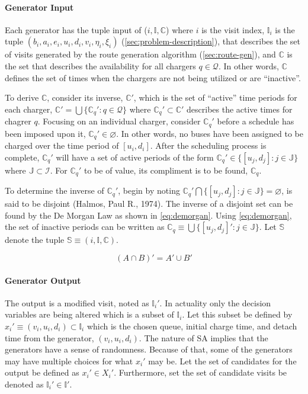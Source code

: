 \documentclass[11pt,a4paper,final]{article}
\newcommand{\visit}{(b_i, a_i, e_i, u_i, d_i, v_i, \eta_i, \xi_i)}
\newcommand{\I}{\mathbb{I}}                 %
\newcommand{\C}{\mathbb{C}}                 %
\newcommand{\Sol}{\mathbb{S}}               %
\newcommand{\Qset}{\mathcal{Q}}             %
\newcommand{\Jsetq}{\mathbb{J}}             %
\begin{document}
\paragraph{Generator Input}
\label{sec:org8f218dd}
Each generator has the tuple input of (\(i, \I, \C\)) where \(i\) is the visit index, \(\I_i\) is the tuple \(\visit\)
(\ref{sec:problem-description}), that describes the set of visits generated by the route generation algorithm
(\ref{sec:route-gen}), and \(\C\) is the set that describes the availability for all chargers \(q \in \Qset\). In other words, \(\C\)
defines the set of times when the chargers are not being utilized or are ``inactive''.

To derive \(\C\), consider its inverse, \(\C'\), which is the set of ``active'' time periods for each charger, \(\C' = \bigcup
\{\C_q' : q \in \mathcal{Q}\}\) where \(\C_q' \subset \C'\) describes the active times for chagrer \(q\). Focusing on an individual charger,
consider \(\C_q'\) before a schedule has been imposed upon it, \(\C_q' \in \varnothing\). In other words, no buses have been
assigned to be charged over the time period of \([u_i, d_i]\). After the scheduling process is complete, \(\C_q'\) will have
a set of active periods of the form \(\C_q' \in \{[u_j, d_j]: j \in \Jsetq \}\) where \(\Jsetq \subset \mathcal{I}\). For \(\C_q'\) to be of
value, its compliment is to be found, \(\C_q\).

To determine the inverse of \(\C_q'\), begin by noting \(\C_q' \bigcap \{[u_j, d_j] : j \in \Jsetq\} = \varnothing\), is said to be
disjoint (Halmos, Paul R., 1974). The inverse of a disjoint set can be found by the De Morgan Law as shown in
\ref{eq:demorgan}. Using \ref{eq:demorgan}, the set of inactive periods can be written as \(\C_q \equiv \bigcup \{[u_j, d_j]': j \in \Jsetq\}\).
Let \(\Sol\) denote the tuple \(\Sol \equiv (i, \I, \C)\).

\begin{equation}
\label{eq:demorgan}
(A \cap B)' = A' \cup B'
\end{equation}

\paragraph{Generator Output}
\label{sec:orgc219b3e}
The output is a modified visit, noted as \(\I_i'\). In actuality only the decision variables are being altered which is a
subset of \(\I_i\). Let this subset be defined by \(x_i' \equiv (v_i, u_i, d_i) \subset \I_i\) which is the chosen queue, initial
charge time, and detach time from the generator, \((v_i, u_i, d_i)\). The nature of SA implies that the generators have a
sense of randomness. Because of that, some of the generators may have multiple choices for what \(x_i'\) may be. Let the
set of candidates for the output be defined as \(x_i' \in X_i'\). Furthermore, set the set of candidate visits be denoted as
\(\I_i' \in \I'\).
\end{document}
